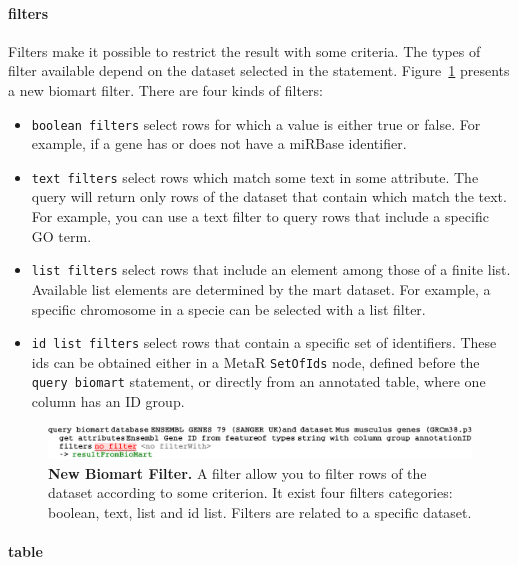 \paragraph{filters}
Filters make it possible to restrict the result with some criteria. The types of filter available depend on the dataset selected in the statement. Figure~\ref{fig:BiomartFilter} presents a new biomart filter. There are four kinds of filters: 
\begin{itemize}

\item \texttt{boolean filters} select rows for which a value is either true or false. For example, if a gene has or does not have a miRBase identifier.
\item \texttt{text filters} select rows which match some text in some attribute. The query will return only rows of the dataset that contain which match the text. For example, you can use a text filter to query rows that include a specific GO term.
\item \texttt{list filters} select rows that include an element among those of a finite list. Available list elements are determined by the mart dataset.  For example, a specific chromosome in a specie can be selected with a list filter.
\item \texttt{id list filters} select rows that contain a specific set of identifiers. These ids can be obtained either in a MetaR \texttt{SetOfIds} node, defined before the \texttt{query biomart} statement, or directly from an annotated table, where one column has an ID group.  


\end{itemize}

 \begin{figure}[h!tbp]
  \centering
  \includegraphics[width=\figWidthWide]{figures/BiomartFilter.pdf}
\caption[New Biomart Filter]{\textbf{New Biomart Filter.} A filter allow you to filter rows of the dataset according to some criterion. It exist four filters categories: boolean, text, list and id list. Filters are related to a specific dataset.}
\label{fig:BiomartFilter}
\end{figure}

\paragraph{table}

